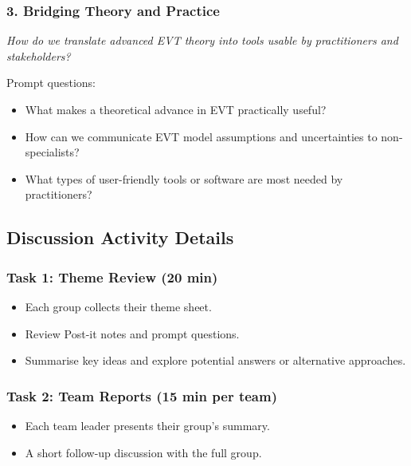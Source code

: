 \documentclass[
  11pt,
  letterpaper,
  DIV=11,
  numbers=noendperiod]{scrartcl}
\providecommand{\tightlist}{%
  \setlength{\itemsep}{0pt}\setlength{\parskip}{0pt}}\usepackage{longtable,booktabs,array}
\begin{document}
\hypertarget{bridging-theory-and-practice}{%
\subsubsection{3. Bridging Theory and
Practice}\label{bridging-theory-and-practice}}

\emph{How do we translate advanced EVT theory into tools usable by
practitioners and stakeholders?}

Prompt questions:

\begin{itemize}
\item
  What makes a theoretical advance in EVT practically useful?
\item
  How can we communicate EVT model assumptions and uncertainties to
  non-specialists?
\item
  What types of user-friendly tools or software are most needed by
  practitioners?
\end{itemize}

\hypertarget{discussion-activity-details}{%
\subsection{Discussion Activity
Details}\label{discussion-activity-details}}

\hypertarget{task-1-theme-review-20-min}{%
\subsubsection{Task 1: Theme Review (20
min)}\label{task-1-theme-review-20-min}}

\begin{itemize}
\tightlist
\item
  Each group collects their theme sheet.
\item
  Review Post-it notes and prompt questions.
\item
  Summarise key ideas and explore potential answers or alternative
  approaches.
\end{itemize}

\hypertarget{task-2-team-reports-15-min-per-team}{%
\subsubsection{Task 2: Team Reports (15 min per
team)}\label{task-2-team-reports-15-min-per-team}}

\begin{itemize}
\tightlist
\item
  Each team leader presents their group's summary.
\item
  A short follow-up discussion with the full group.
\end{itemize}
\end{document}
